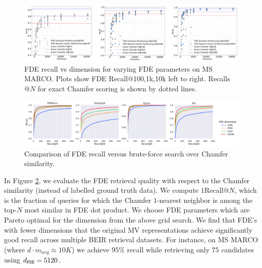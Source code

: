 \begin{figure}[t]
    \centering
  \includegraphics[width=\linewidth]{plots/Grid_Search_Three.png}
    \caption{\small FDE recall vs dimension for varying FDE parameters on MS MARCO. Plots show FDE Recall$@$100,1k,10k left to right.  Recalls$@N$ for exact Chamfer scoring is shown by dotted lines. }
         \label{fig:grid_search} %
\end{figure}


\begin{figure}[t]
    \centering
  \includegraphics[width=\linewidth]{plots/recall_vs_chamfer.png}
    \caption{\small Comparison of FDE recall versus brute-force search over Chamfer similarity.}
         \label{fig:chamfer} %
\end{figure}



In Figure \ref{fig:chamfer}, we evaluate the FDE retrieval quality with respect to the Chamfer similarity (instead of labelled ground truth data).  We compute $1$Recall@$N$, which is the fraction of queries for which the Chamfer $1$-nearest neighbor is among the top-$N$ most similar in FDE dot product. We choose FDE parameters which are Pareto optimal for the dimension from the above grid search. We find that FDE's with fewer dimensions that the original MV representations achieve significantly good recall across multiple BEIR retrieval datasets. For instance, on MS MARCO (where $d\cdot m_{avg} \approx 10K$) we achieve $95\%$ recall while retrieving only $75$ candidates using $d_{\texttt{FDE}} = 5120$.


